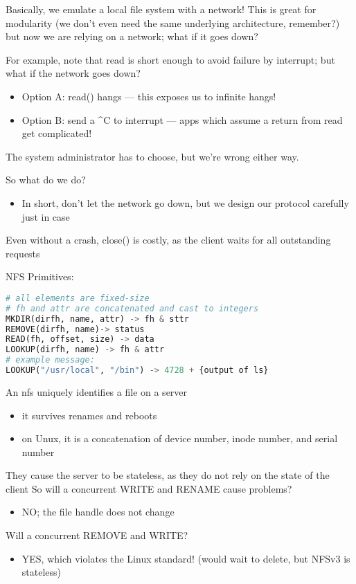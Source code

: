 \documentclass[../../lecture_notes.tex]{subfiles}
\begin{document}
Basically, we emulate a local file system with a network! This is great for modularity (we don’t even need the same underlying architecture, remember?) but now we are relying on a network; what if it goes down?

For example, note that read is short enough to avoid failure by interrupt; but what if the network goes down?
\begin{itemize}
\item Option A: read() hangs --- this exposes us to infinite hangs!
\item Option B: send a \^{}C to interrupt --- apps which assume a return from read get complicated!
\end{itemize}
The system administrator has to choose, but we’re wrong either way.

So what do we do?
\begin{itemize}
\item In short, don’t let the network go down, but we design our protocol carefully just in case
\end{itemize}

Even without a crash, close() is costly, as the client waits for all outstanding requests

NFS Primitives:
\begin{lstlisting}[language = python]
# all elements are fixed-size
# fh and attr are concatenated and cast to integers
MKDIR(dirfh, name, attr) -> fh & sttr
REMOVE(dirfh, name)-> status
READ(fh, offset, size) -> data
LOOKUP(dirfh, name) -> fh & attr
# example message:
LOOKUP("/usr/local", "/bin") -> 4728 + {output of ls}
\end{lstlisting}


An nfs  uniquely identifies a file on a server
\begin{itemize}
\item it survives renames and reboots
\item on Unux, it is a concatenation of device number, inode number, and serial number
\end{itemize}

They cause the server to be stateless, as they do not rely on the state of the client
So will a concurrent WRITE and RENAME cause problems?
\begin{itemize}
	\item NO; the file handle does not change
\end{itemize}

Will a concurrent REMOVE and WRITE?
\begin{itemize}
	\item YES, which violates the Linux standard! (would wait to delete, but NFSv3 is stateless)
\end{itemize}
\end{document}
